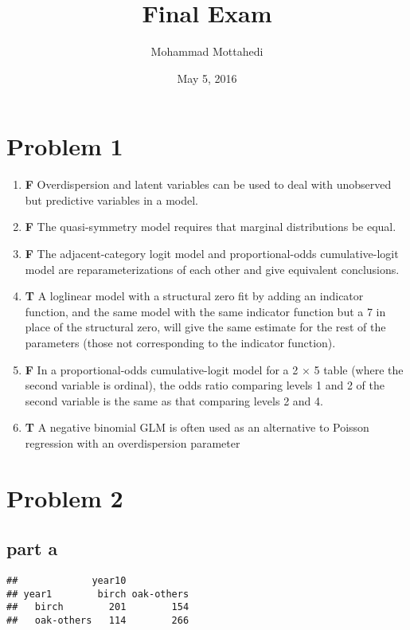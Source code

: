 \documentclass[]{article}
\title{Final Exam}
\author{Mohammad Mottahedi}
\date{May 5, 2016}
\begin{document}
\maketitle


\section{Problem 1}\label{problem-1}

\begin{enumerate}
\def\labelenumi{(\alph{enumi})}
\item
  \textbf{F} Overdispersion and latent variables can be used to deal
  with unobserved but predictive variables in a model.
\item
  \textbf{F} The quasi-symmetry model requires that marginal
  distributions be equal.
\item
  \textbf{F} The adjacent-category logit model and proportional-odds
  cumulative-logit model are reparameterizations of each other and give
  equivalent conclusions.
\item
  \textbf{T} A loglinear model with a structural zero fit by adding an
  indicator function, and the same model with the same indicator
  function but a 7 in place of the structural zero, will give the same
  estimate for the rest of the parameters (those not corresponding to
  the indicator function).
\item
  \textbf{F} In a proportional-odds cumulative-logit model for a 2 × 5
  table (where the second variable is ordinal), the odds ratio comparing
  levels 1 and 2 of the second variable is the same as that comparing
  levels 2 and 4.
\item
  \textbf{T} A negative binomial GLM is often used as an alternative to
  Poisson regression with an overdispersion parameter
\end{enumerate}

\section{Problem 2}\label{problem-2}

\subsection{part a}\label{part-a}

\begin{verbatim}
##             year10
## year1        birch oak-others
##   birch        201        154
##   oak-others   114        266
\end{verbatim}
\end{document}
